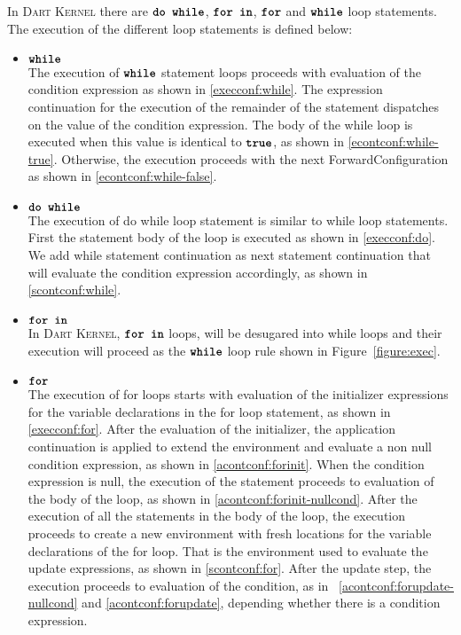 \documentclass[a4paper,oneside,fleqn]{article}
\newcommand{\kernel}{\textsc{Dart Kernel}}
\newcommand{\synt}[1]{\ensuremath{\text{\textbf{\texttt{#1}}}}}
\DeclareMathOperator{\dowhile}{\synt{do~while}}
\DeclareMathOperator{\while}{\synt{while}}
\DeclareMathOperator{\forin}{\synt{for~in}}
\DeclareMathOperator{\for}{\synt{for}}
\newcommand{\true}{\synt{true}}
\begin{document}
In \kernel{} there are $\dowhile$, $\forin$, $\for$ and $\while$ loop statements.
The execution of the different loop statements is defined below:

\begin{itemize}
    \item  $\while$\\
        The execution of  $\while$ statement loops proceeds with evaluation of the condition expression as shown in \eqref{execconf:while}.
        The expression continuation for the execution of the remainder of the statement dispatches on the value of the condition expression.
        The body of the while loop is executed when this value is identical to $\true$, as shown in \eqref{econtconf:while-true}.
        Otherwise, the execution proceeds with the next ForwardConfiguration as shown in \eqref{econtconf:while-false}.
    \item $\dowhile$\\
        The execution of do while loop statement is similar to while loop statements.
        First the statement body of the loop is executed as shown in \eqref{execconf:do}.
        We add while statement continuation as next statement continuation that will evaluate the condition expression accordingly, as shown in \eqref{scontconf:while}.
    \item $\forin$\\
        In \kernel{}, $\forin$ loops, will be desugared into while loops and their execution will proceed as the $\while$ loop rule shown in Figure~\ref{figure:exec}.
    \item $\for$\\
        The execution of for loops starts with evaluation of the initializer expressions for the variable declarations in the for loop statement, as shown in \eqref{execconf:for}.
        After the evaluation of the initializer, the application continuation is applied to extend the environment and evaluate a non null condition expression, as shown in \eqref{acontconf:forinit}.
        When the condition expression is null, the execution of the statement proceeds to evaluation of the body of the loop, as shown in \eqref{acontconf:forinit-nullcond}.
        After the execution of all the statements in the body of the loop, the execution proceeds to create a new environment with fresh locations for the variable declarations of the for loop.
        That is the environment used to evaluate the update expressions, as shown in \eqref{scontconf:for}.
        After the update step, the execution proceeds to evaluation of the condition, as in ~\eqref{acontconf:forupdate-nullcond} and \eqref{acontconf:forupdate}, depending whether there is a condition expression.
\end{itemize}
\end{document}
